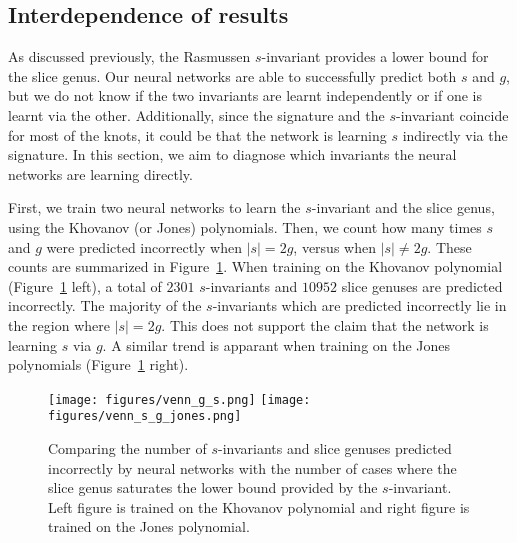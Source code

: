 \documentclass[11pt]{article}
\numberwithin{equation}{section}
\begin{document}
\subsection{Interdependence of results}
As discussed previously, the Rasmussen $s$-invariant provides a lower bound for the slice genus.
Our neural networks are able to successfully predict both $s$ and $g$, but we do not know if the two invariants are learnt independently or if one is learnt via the other.
Additionally, since the signature and the $s$-invariant coincide for most of the knots, it could be that the network is learning $s$ indirectly via the signature.
In this section, we aim to diagnose which invariants the neural networks are learning directly.

First, we train two neural networks to learn the $s$-invariant and the slice genus, using the Khovanov (or Jones) polynomials.
Then, we count how many times $s$ and $g$ were predicted incorrectly when $|s| = 2g$, versus when $|s| \neq 2g$.
These counts are summarized in Figure~\ref{fig:venn-s-g}.
When training on the Khovanov polynomial (Figure~\ref{fig:venn-s-g} left), a total of $2301$ $s$-invariants and $10952$ slice genuses are predicted incorrectly. The majority of the $s$-invariants which are predicted incorrectly lie in the region where $|s| = 2g$. This does not support the claim that the network is learning $s$ via $g$. A similar trend is apparant when training on the Jones polynomials (Figure~\ref{fig:venn-s-g} right).

\begin{figure}
    \centering
    \texttt{[image: figures/venn\_g\_s.png]}
    \texttt{[image: figures/venn\_s\_g\_jones.png]}
    \caption{\small{Comparing the number of $s$-invariants and slice genuses predicted incorrectly by neural networks with the number of cases where the slice genus saturates the lower bound provided by the $s$-invariant. Left figure is trained on the Khovanov polynomial and right figure is trained on the Jones polynomial.}}
    \label{fig:venn-s-g}
\end{figure}
\end{document}
